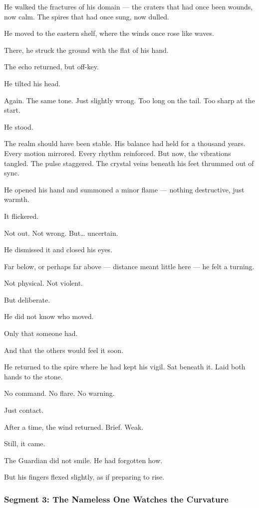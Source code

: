 \documentclass[9pt]{article}
\begin{document}
He walked the fractures of his domain — the craters that had once been wounds, now calm. The spires that had once sung, now dulled.

He moved to the eastern shelf, where the winds once rose like waves.

There, he struck the ground with the flat of his hand.

The echo returned, but off-key.

He tilted his head.

Again. The same tone. Just slightly wrong. Too long on the tail. Too sharp at the start.

He stood.

The realm should have been stable. His balance had held for a thousand years. Every motion mirrored. Every rhythm reinforced. But now, the vibrations tangled. The pulse staggered. The crystal veins beneath his feet thrummed out of sync.

He opened his hand and summoned a minor flame — nothing destructive, just warmth.

It flickered.

Not out. Not wrong. But… uncertain.

He dismissed it and closed his eyes.

Far below, or perhaps far above — distance meant little here — he felt a turning.

Not physical. Not violent.

But deliberate.

He did not know who moved.

Only that someone had.

And that the others would feel it soon.

He returned to the spire where he had kept his vigil. Sat beneath it. Laid both hands to the stone.

No command. No flare. No warning.

Just contact.

After a time, the wind returned. Brief. Weak.

Still, it came.

The Guardian did not smile. He had forgotten how.

But his fingers flexed slightly, as if preparing to rise.

\newpage

\subsubsection*{Segment 3: The Nameless One Watches the Curvature}
\end{document}
